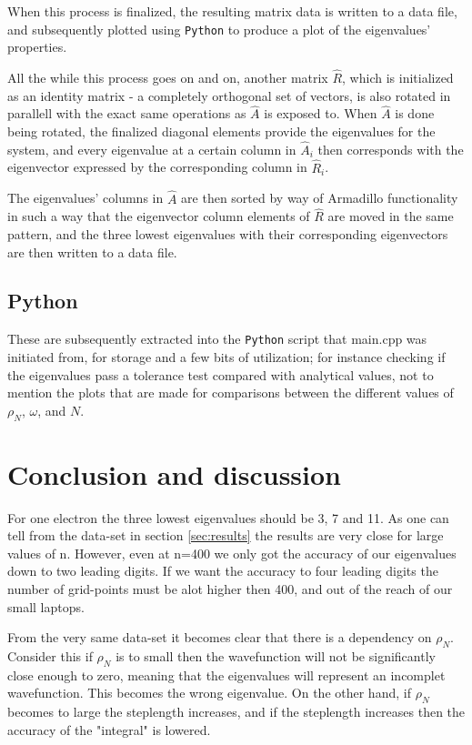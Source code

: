 \documentclass[11pt,a4paper,notitlepage]{article}
\begin{document}
  When this process is finalized, the resulting matrix data is written to a data file, and subsequently plotted using \verb|Python| to produce a plot of the eigenvalues' properties.
  
  All the while this process goes on and on, another matrix $\hat{R}$, which is initialized as an identity matrix - a completely orthogonal set of vectors, is also rotated in parallell with the exact same operations as $\hat{A}$ is exposed to. When $\hat{A}$ is done being rotated, the finalized diagonal elements provide the eigenvalues for the system, and every eigenvalue at a certain column in $\hat{A}_i$ then corresponds with the eigenvector expressed by the corresponding column in $\hat{R}_i$.
 
 The eigenvalues' columns in $\hat{A}$ are then sorted by way of Armadillo functionality in such a way that the eigenvector column elements of $\hat{R}$ are moved in the same pattern, and the three lowest eigenvalues with their corresponding eigenvectors are then written to a data file.
 
 \subsection{Python}
 These are subsequently extracted into the \verb|Python| script that main.cpp was initiated from, for storage and a few bits of utilization; for instance checking if the eigenvalues pass a tolerance test compared with analytical values, not to mention the plots that are made for comparisons between the different values of $\rho_N$, $\omega$, and $N$.

\section{Conclusion and discussion}

For one electron the three lowest eigenvalues should be 3, 7 and 11. As one can tell from the data-set in section \ref{sec:results} the results are very close for large values of n. However, even at n=400 we only got the accuracy of our eigenvalues down to two leading digits. If we want the accuracy to four leading digits the number of grid-points must be alot higher then 400, and out of the reach of our small laptops.

From the very same data-set it becomes clear that there is a dependency on $\rho_N$. Consider this if $\rho_N$ is to small then the wavefunction will not be significantly close enough to zero, meaning that the eigenvalues will represent an incomplet wavefunction. This becomes the wrong eigenvalue. On the other hand, if $\rho_N$ becomes to large the steplength increases, and if the steplength increases then the accuracy of the "integral" is lowered.
\end{document}
